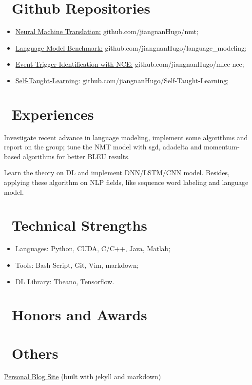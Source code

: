 \documentclass{resume}
\begin{document}
\section{\faGithub\ Github Repositories}
\begin{itemize}[parsep=0.5ex]
  \item \href{https://github.com/jiangnanHugo/nmt}{Neural Machine Translation:} github.com/jiangnanHugo/nmt;
  \item \href{https://github.com/jiangnanHugo/language_modeling}{Language Model Benchmark:} github.com/jiangnanHugo/language\_modeling;
  \item \href{https://github.com/jiangnanHugo/mlee-nce}{Event Trigger Identification with NCE:} github.com/jiangnanHugo/mlee-nce;
  \item \href{https://github.com/jiangnanHugo/Self-Taught-Learning}{Self-Taught-Learning:} github.com/jiangnanHugo/Self-Taught-Learning;
\end{itemize}

\section{\faUsers\ Experiences }
Investigate recent advance in language modeling, implement some algorithms and report on the group; tune the NMT model with sgd, adadelta and momentum-based algorithms for better BLEU results.

Learn the theory on DL and implement DNN/LSTM/CNN model. Besides, applying these algorithm on NLP fields, like sequence word labeling and language model.

\section{\faCogs\ Technical Strengths}
\begin{itemize}[parsep=0.5ex]
  \item Languages: Python, CUDA, C/C++, Java, Matlab;
  \item Tools: Bash Script, Git, Vim, markdown;
  \item DL Library: Theano, Tensorflow.
\end{itemize}

\section{\faStar\ Honors and Awards}

\section{\faStar\ Others}
\href{https://jiangnanhugo.github.io/blog/}{Personal Blog Site} (built with jekyll and markdown)
\end{document}
